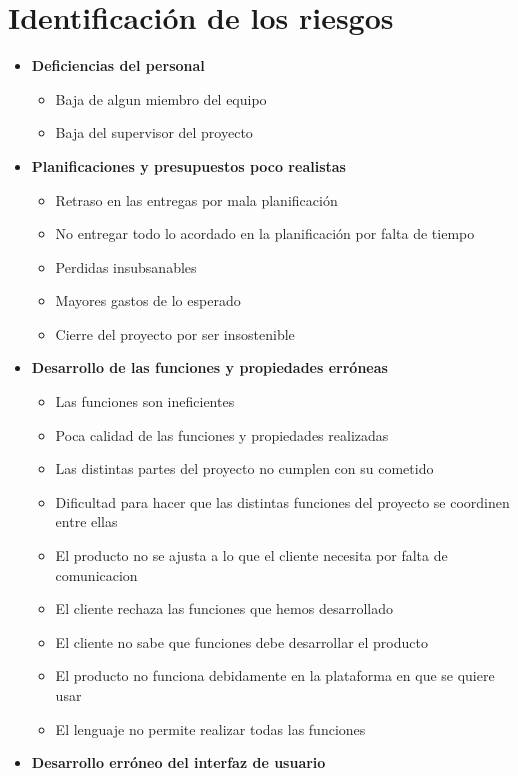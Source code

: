\documentclass[spanish,a4paper,12pt]{report}	%
\begin{document}
\part{Identificación de los riesgos}
\begin{itemize}
\item \textbf {Deficiencias del personal}
	\begin{itemize}
		\item {Baja de algun miembro del equipo}
		\item {Baja del supervisor del proyecto}
	\end{itemize}
\item \textbf {Planificaciones y presupuestos poco realistas}
	\begin{itemize}
		\item {Retraso en las entregas por mala planificación}
		\item {No entregar todo lo acordado en la planificación por falta de tiempo}
		\item {Perdidas insubsanables}
		\item {Mayores gastos de lo esperado}
		\item {Cierre del proyecto por ser insostenible}
	\end{itemize}
\item \textbf {Desarrollo de las funciones y propiedades erróneas}
	\begin{itemize}
		\item {Las funciones son ineficientes}
		\item {Poca calidad de las funciones y propiedades realizadas}
		\item {Las distintas partes del proyecto no cumplen con su cometido}
		\item {Dificultad para hacer que las distintas funciones del proyecto se coordinen entre ellas}
		\item {El producto no se ajusta a lo que el cliente necesita por falta de comunicacion}
		\item {El cliente rechaza las funciones que hemos desarrollado}
		\item {El cliente no sabe que funciones debe desarrollar el producto}
		\item {El producto no funciona debidamente en la plataforma en que se quiere usar}
		\item {El lenguaje no permite realizar todas las funciones}
	\end{itemize}
\item \textbf {Desarrollo erróneo del interfaz de usuario}

\end{itemize}
\end{document}
